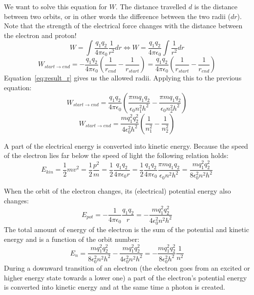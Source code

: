 \documentclass[12pt,a4paper]{article}
\numberwithin{equation}{section}
\numberwithin{figure}{section}
\numberwithin{table}{section}
\begin{document}
We want to solve this equation for $W$. The distance travelled $d$ is the distance between two orbits, or in other words the difference between the two radii ($dr$). Note that the strength of the electrical force changes with the distance between the electron and proton!
\begin{equation}
W = \int \frac{q_1 q_2}{4 \pi \epsilon_0} \frac{1}{r^2} dr \Leftrightarrow W = \frac{q_1 q_2}{4 \pi \epsilon_0} \int \frac{1}{r^2} dr \label{eq:work_elec_int}
\end{equation}
\begin{equation}
W_{start \rightarrow end} = - \frac{q_1 q_2}{4 \pi \epsilon_0} \left( \frac{1}{r_{end}} - \frac{1}{r_{start}}\right) = \frac{q_1 q_2}{4 \pi \epsilon_0} \left( \frac{1}{r_{start}} - \frac{1}{r_{end}}\right) \label{eq:work_elec_end_start}
\end{equation}
Equation~\ref{eq:result_r} gives us the allowed radii. Applying this to the previous equation:
\begin{equation}
W_{start \rightarrow end} = \frac{q_1 q_2}{4 \pi \epsilon_0} \left( \frac{\pi m q_1 q_2}{ \epsilon_0 n_{1}^2 h^2} - \frac{\pi m q_1 q_2}{\epsilon_0 n_{2}^2 h^2}\right)  \label{eq:work_elec_end_start_r}
\end{equation}
\begin{equation}
W_{start \rightarrow end} = \frac{m q_{1}^2 q_{2}^2}{4 \epsilon_{0}^2 h^2} \left( \frac{1}{n_{1}^2} - \frac{1}{n_{2}^2}\right) \label{eq:work_elec_end_start_r_simplified}
\end{equation}

A part of the electrical energy is converted into kinetic energy. Because the speed of the electron lies far below the speed of light the following relation holds:
\begin{equation}
E_{kin} = \frac{1}{2} mv^2 = \frac{1}{2} \frac{p^2}{m} = \frac{1}{2} \frac{q_1 q_2}{4 \pi \epsilon_0 r} = \frac{1}{2} \frac{q_1 q_2}{4 \pi \epsilon_0} \frac{\pi m q_1 q_2}{\epsilon_0 n^2 h^2}=\frac{m q_{1}^2 q_{2}^2}{8 \epsilon_{0}^2 n^2 h^2}%
\label{eq:E_kin}
\end{equation}

When the orbit of the electron changes, its (electrical) potential energy also changes:
\begin{equation}
E_{pot}=- \frac{1}{4 \pi \epsilon_0} \frac{q_1 q_2}{r} = - \frac{m q_{1}^2 q_{2}^2}{4 \epsilon_{0}^2 n^2 h^2} \label{eq:pot}
\end{equation}
The total amount of energy of the electron is the sum of the potential and kinetic energy and is a function of the orbit number:
\begin{equation}
E_{n} = \frac{m q_{1}^2 q_{2}^2}{8 \epsilon_{0}^2 n^2 h^2} - \frac{m q_{1}^2 q_{2}^2}{4 \epsilon_{0}^2 n^2 h^2} = - \frac{m q_{1}^2 q_{2}^2}{8 \epsilon_{0}^2 h^2} \frac{1}{n^2} \label{eq:E_tot}
\end{equation}
During a downward transition of an electron (the electron goes from an excited or higher energy state towards a lower one) a part of the electron's potential energy is converted into kinetic energy and at the same time a photon is created.
\end{document}
